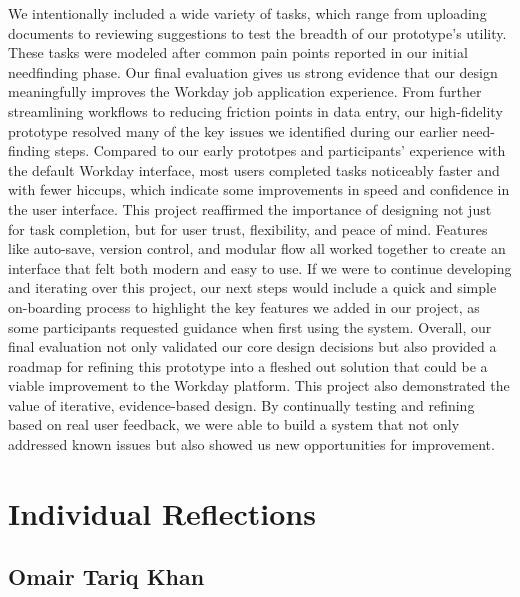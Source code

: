 \documentclass[
	letterpaper, %
]{jdf}
\begin{document}
\begin{sloppypar}
We intentionally included a wide variety of tasks, which range from uploading documents to reviewing suggestions to test the breadth of our prototype's utility. These tasks were modeled after common pain points reported in our initial needfinding phase. Our final evaluation gives us strong evidence that our design meaningfully improves the Workday job application experience. From further streamlining workflows to reducing friction points in data entry, our high-fidelity prototype resolved many of the key issues we identified during our earlier need-finding steps. Compared to our early prototpes and participants' experience with the default Workday interface, most users completed tasks noticeably faster and with fewer hiccups, which indicate some improvements in speed and confidence in the user interface. This project reaffirmed the importance of designing not just for task completion, but for user trust, flexibility, and peace of mind. Features like auto-save, version control, and modular flow all worked together to create an interface that felt both modern and easy to use. If we were to continue developing and iterating over this project, our next steps would include a quick and simple on-boarding process to highlight the key features we added in our project, as some participants requested guidance when first using the system. Overall, our final evaluation not only validated our core design decisions but also provided a roadmap for refining this prototype into a fleshed out solution that could be a viable improvement to the Workday platform. This project also demonstrated the value of iterative, evidence-based design. By continually testing and refining based on real user feedback, we were able to build a system that not only addressed known issues but also showed us new opportunities for improvement. 

\newpage

\section{Individual Reflections}
\subsection{Omair Tariq Khan}


\end{sloppypar}
\end{document}
